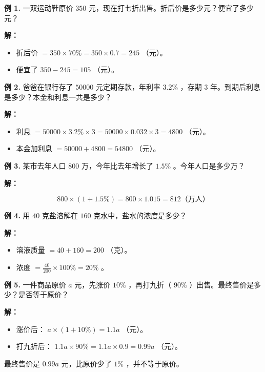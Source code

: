 \begin{workedexamples}


\textbf{例 1.} 一双运动鞋原价 $350$ 元，现在打七折出售。折后价是多少元？便宜了多少元？

\textbf{解：}
\begin{itemize}
  \item 折后价 $= 350 \times 70\% = 350 \times 0.7 = 245$ （元）。
  \item 便宜了 $350 - 245 = 105$ （元）。
\end{itemize}


\textbf{例 2.} 爸爸在银行存了 $50000$ 元定期存款，年利率 $3.2\%$ ，存期 $3$ 年。到期后利息是多少？本金和利息一共是多少？

\textbf{解：}
\begin{itemize}
  \item 利息 $= 50000 \times 3.2\% \times 3 = 50000 \times 0.032 \times 3 = 4800$ （元）。
  \item 本金加利息 $= 50000 + 4800 = 54800$ （元）。
\end{itemize}


\textbf{例 3.} 某市去年人口 $800$ 万，今年比去年增长了 $1.5\%$ 。今年人口是多少万？

\textbf{解：}

\[
800 \times (1 + 1.5\%) = 800 \times 1.015 = 812 \text{（万人）}
\]


\textbf{例 4.} 用 $40$ 克盐溶解在 $160$ 克水中，盐水的浓度是多少？

\textbf{解：}
\begin{itemize}
  \item 溶液质量 $= 40 + 160 = 200$ （克）。
  \item 浓度 $= \frac{40}{200} \times 100\% = 20\%$ 。
\end{itemize}


\textbf{例 5.} 一件商品原价 $a$ 元，先涨价 $10\%$ ，再打九折（ $90\%$ ）出售。最终售价是多少？是否等于原价？

\textbf{解：}
\begin{itemize}
  \item 涨价后： $a \times (1 + 10\%) = 1.1a$ （元）。
  \item 打九折后： $1.1a \times 90\% = 1.1a \times 0.9 = 0.99a$ （元）。
\end{itemize}


最终售价是 $0.99a$ 元，比原价少了 $1\%$ ，并不等于原价。

\end{workedexamples}

